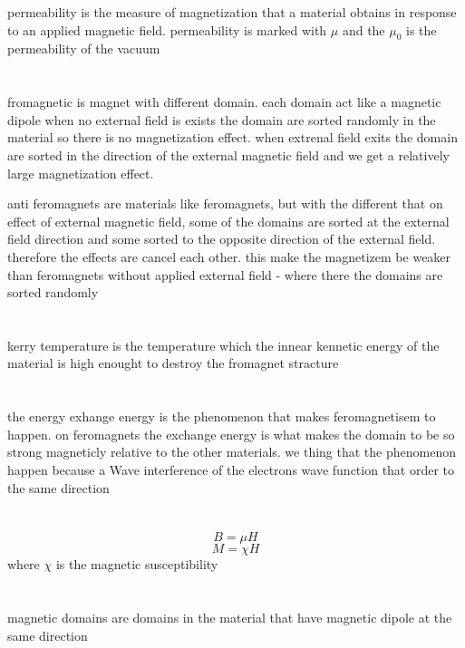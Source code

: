 \documentclass{article}
\begin{document}
permeability is the measure of magnetization that a material obtains in response to an applied magnetic field.
permeability is marked with $\mu$ and the $\mu_0$ is the permeability of the vacuum


\section{}
fromagnetic is magnet with different domain. each domain act like a magnetic dipole
when no external field is exists the domain are sorted randomly in the material so there is
no magnetization effect. when extrenal field exits the domain are sorted in the direction of the external
magnetic field and we get a relatively large magnetization effect.

anti feromagnets are materials like feromagnets, but with the different that on
effect of external magnetic field, some of the domains are sorted at the external field direction
and some sorted to the opposite direction of the external field.
therefore the effects are cancel each other. this make the magnetizem be weaker than
feromagnets without applied external field - where there the domains are sorted randomly

\section{}
kerry temperature is the temperature which the innear kennetic energy of the material is
high enought to destroy the fromagnet stracture

\section{}
the energy exhange energy is the phenomenon that makes feromagnetisem to happen.
on feromagnets the exchange energy is what makes the domain to be so strong magneticly relative to the other materials.
we thing that the phenomenon happen because a Wave interference of the electrons wave function
that order to the same direction

\section{}
$$B = \mu H$$
$$M = \chi H$$
where $\chi $  is the magnetic susceptibility

\section{}
magnetic domains are domains in the material that have magnetic dipole at the same direction
\end{document}
